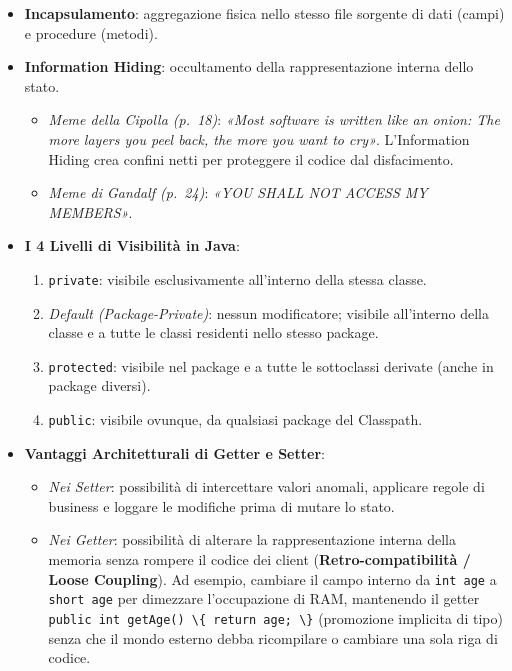 \documentclass[11pt,a4paper,oneside]{report}
\newcommand{\passthrough}[1]{#1}
\providecommand{\tightlist}{\setlength{\itemsep}{0pt}\setlength{\parskip}{0pt}}
\begin{document}
\begin{itemize}
\tightlist
\item
  \textbf{Incapsulamento}: aggregazione fisica nello stesso file
  sorgente di dati (campi) e procedure (metodi).
\item
  \textbf{Information Hiding}: occultamento della rappresentazione
  interna dello stato.

  \begin{itemize}
  \tightlist
  \item
    \emph{Meme della Cipolla (p.~18)}: \emph{«Most software is written
    like an onion: The more layers you peel back, the more you want to
    cry»}. L'Information Hiding crea confini netti per proteggere il
    codice dal disfacimento.
  \item
    \emph{Meme di Gandalf (p.~24)}: \emph{«YOU SHALL NOT ACCESS MY
    MEMBERS»}.
  \end{itemize}
\item
  \textbf{I 4 Livelli di Visibilità in Java}:

  \begin{enumerate}
  \def\labelenumi{\arabic{enumi}.}
  \tightlist
  \item
    \passthrough{\lstinline!private!}: visibile esclusivamente
    all'interno della stessa classe.
  \item
    \emph{Default (Package-Private)}: nessun modificatore; visibile
    all'interno della classe e a tutte le classi residenti nello stesso
    package.
  \item
    \passthrough{\lstinline!protected!}: visibile nel package e a tutte
    le sottoclassi derivate (anche in package diversi).
  \item
    \passthrough{\lstinline!public!}: visibile ovunque, da qualsiasi
    package del Classpath.
  \end{enumerate}
\item
  \textbf{Vantaggi Architetturali di Getter e Setter}:

  \begin{itemize}
  \tightlist
  \item
    \emph{Nei Setter}: possibilità di intercettare valori anomali,
    applicare regole di business e loggare le modifiche prima di mutare
    lo stato.
  \item
    \emph{Nei Getter}: possibilità di alterare la rappresentazione
    interna della memoria senza rompere il codice dei client
    (\textbf{Retro-compatibilità / Loose Coupling}). Ad esempio,
    cambiare il campo interno da \passthrough{\lstinline!int age!} a
    \passthrough{\lstinline!short age!} per dimezzare l'occupazione di
    RAM, mantenendo il getter
    \passthrough{\lstinline!public int getAge() \{ return age; \}!}
    (promozione implicita di tipo) senza che il mondo esterno debba
    ricompilare o cambiare una sola riga di codice.
  \end{itemize}
\end{itemize}
\end{document}
